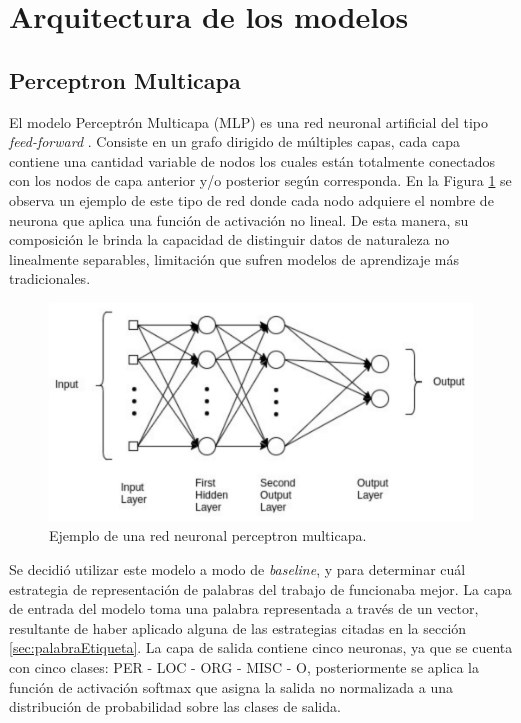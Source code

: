 \section{Arquitectura de los modelos}

\subsection{Perceptron Multicapa}\label{sec:perceptron}

El modelo Perceptrón Multicapa (MLP) es una red neuronal artificial del tipo \textit{feed-forward} \cite{Hornik:1989:MFN:70405.70408}. Consiste en un grafo dirigido de múltiples capas, cada capa contiene una cantidad variable de nodos los cuales están totalmente conectados con los nodos de capa anterior y/o posterior según corresponda. En la Figura \ref{fig:MLP_architecture} se observa un ejemplo de este tipo de red donde cada nodo adquiere el nombre de neurona que aplica una función de activación no lineal. De esta manera, su composición le brinda la capacidad de distinguir datos de naturaleza no linealmente separables, limitación que sufren modelos de aprendizaje más tradicionales.

\begin{figure}[ht]
\begin{center}
\includegraphics[width=.9\linewidth]{images/MLP_architecture.png}
\caption{Ejemplo de una red neuronal perceptron multicapa.}
\label{fig:MLP_architecture}
\end{center}
\end{figure}

Se decidió utilizar este modelo a modo de \textit{baseline}, y para determinar cuál estrategia de representación de palabras del trabajo de \cite{iacobacci-etal-2016-embeddings} funcionaba mejor. La capa de entrada del modelo toma una palabra representada a través de un vector, resultante de haber aplicado alguna de las estrategias citadas en la sección \ref{sec:palabraEtiqueta}. La capa de salida contiene cinco neuronas, ya que se cuenta con cinco clases: PER - LOC - ORG - MISC - O, posteriormente se aplica la función de activación softmax que asigna la salida no normalizada a una distribución de probabilidad sobre las clases de salida.

